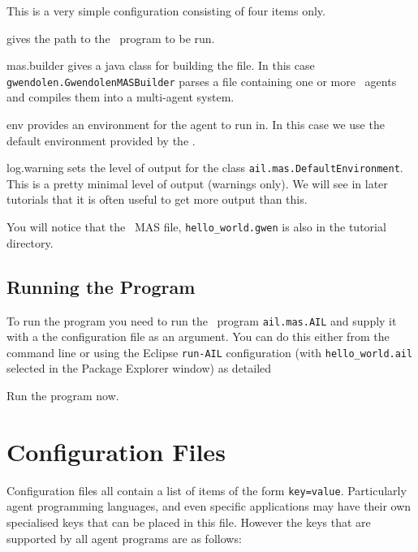 This is a very simple configuration consisting of four items only.
\begin{description}
\item[mas.file] gives the path to the \gwendolen\ program to be run.
\begin{sloppypar}
\item[mas.builder] gives a java class for building the file.  In this case \texttt{gwendolen.GwendolenMASBuilder} parses a file containing one or more \gwendolen\ agents and compiles them into a multi-agent system.
\item[env] provides an environment for the agent to run in.  In this case we use the default environment provided by the \ail.
\item[log.warning] sets the level of output for the class \texttt{ail.mas.DefaultEnvironment}.  This is a pretty minimal level of output (warnings only).  We will see in later tutorials that it is often useful to get more output than this.
\end{sloppypar}
\end{description}
You will notice that the \gwendolen\ MAS file, \texttt{hello\_world.gwen} is also in the tutorial directory.

\subsection{Running the Program}

To run the program you need to run the \java\ program \texttt{ail.mas.AIL} and supply it with a the configuration file as an argument.  You can do this either from the command line or using the Eclipse \texttt{run-AIL} configuration (with \texttt{hello\_world.ail} selected in the Package Explorer window) as detailed 

Run the program now.

\section{Configuration Files}

Configuration files all contain a list of items of the form \texttt{key=value}.  Particularly agent programming languages, and even specific applications may have their own specialised keys that can be placed in this file.  However the keys that are supported by all agent programs are as follows:

